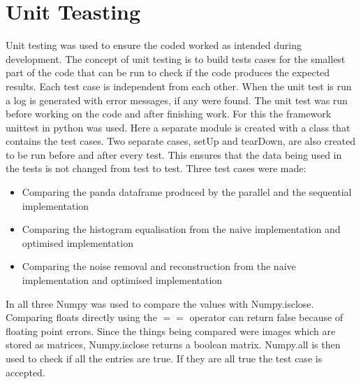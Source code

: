 \section{Unit Teasting}
Unit testing was used to ensure the coded worked as intended during development. The concept of unit testing is to build tests cases for the smallest part of the code that can be run to check if the code produces the expected results. Each test case is independent from each other.  When the unit test is run a log is generated with error messages, if any were found. The unit test was run before working on the code and after finishing work.  For this the framework unittest in python was used.  Here a separate module is created with a class that contains the test cases. Two separate cases, setUp and tearDown, are also created to be run before and after every test. This ensures that the data being used in the tests is not changed from test to test. Three test cases were made:
\begin{itemize}
\item Comparing the panda dataframe produced by the parallel and the sequential implementation
\item Comparing the histogram equalisation from the naive implementation and optimised implementation
\item Comparing the noise removal and reconstruction from the naive implementation and optimised implementation
\end{itemize}
\noindent
In all three Numpy was used to compare the values with Numpy.isclose. Comparing floats directly using the  $==$ operator can return false because of floating point errors. Since the things being compared were images which are stored as matrices, Numpy.isclose returns a boolean matrix. Numpy.all is then used to check if all the entries are true. If they are all true the test case is accepted.